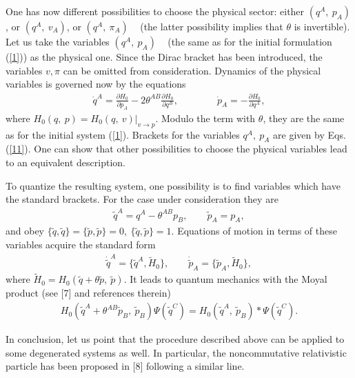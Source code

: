 \documentclass[paper a4]{article}
\begin{document}
One has now different possibilities to choose the physical sector: either
$(q^A, ~ p_A)$, or $(q^A, ~ v_A)$, or $(q^A, ~ \pi_A)$ ~
(the latter possibility implies that $\theta$ is invertible).
Let us take the variables $(q^A, ~ p_A)$ ~ (the same as for the initial
formulation (\ref{1})) as the physical one. Since the
Dirac bracket has been introduced,
the variables $v, \pi$ can be omitted from consideration.
Dynamics of the physical variables is governed now by the equations
\begin{eqnarray}\label{13}
\dot q^A=\frac{\partial H_0}{\partial p_A}-2\theta^{AB}
\frac{\partial H_0}{\partial q^B}, \qquad
\qquad \dot p_A=-\frac{\partial H_0}{\partial q^A},
\end{eqnarray}
where $H_0(q, ~ p)=H_0(q, ~ v)|_{v\rightarrow p}$.
Modulo the term with $\theta$, they are the same as for the initial
system (\ref{1}). Brackets for the variables $q^A, ~ p_A$ are given
by Eqs.(\ref{11}). One can show that other possibilities to
choose the physical variables lead to an equivalent description.

To quantize the resulting system, one possibility is to find variables
which have the standard brackets. For the case under consideration
they are
\begin{eqnarray}\label{14}
\tilde q^A=q^A-\theta^{AB}p_B, \qquad \tilde p_A=p_A,
\end{eqnarray}
and obey $\{\tilde q, \tilde q\}=\{\tilde p, \tilde p\}=0, ~
\{\tilde q, \tilde p\}=1$. Equations of motion in terms
of these variables acquire the standard form
\begin{eqnarray}\label{15}
\dot{\tilde q}^A=\{\tilde q^A, \tilde H_0\}, \qquad
\dot{\tilde p}_A=\{\tilde p_A, \tilde H_0\},
\end{eqnarray}
where $\tilde H_0=H_0(\tilde q+\theta\tilde p, ~ \tilde p)$. It leads to
quantum
mechanics with the Moyal product (see [7] and references therein)
\begin{eqnarray}\label{16}
H_0(\tilde q^A+\theta^{AB}\tilde p_B, ~ \tilde p_B)\Psi(\tilde q^C)=
H_0(\tilde q^A, ~ \tilde p_B)*\Psi(\tilde q^C).
\end{eqnarray}

In conclusion, let us point that the procedure described above can be
applied to some degenerated systems as well. In particular, the
noncommutative relativistic particle has been proposed in [8]
following a similar line.
\end{document}
